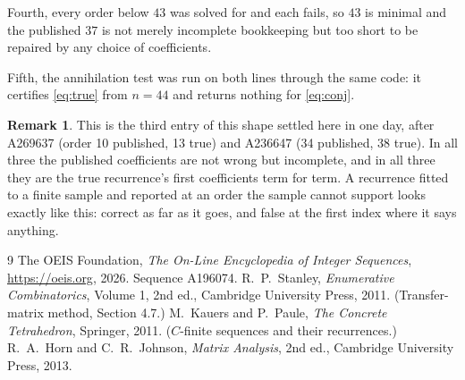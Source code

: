 \documentclass[11pt,a4paper]{article}
\theoremstyle{plain}
\theoremstyle{definition}
\newtheorem{remark}[theorem]{Remark}
\begin{document}
Fourth, every order below $43$ was solved for and each fails, so $43$ is minimal and the
published $37$ is not merely incomplete bookkeeping but too short to be repaired by any
choice of coefficients.

Fifth, the annihilation test was run on both lines through the same code: it certifies
\eqref{eq:true} from $n=44$ and returns nothing for \eqref{eq:conj}.

\begin{remark}
This is the third entry of this shape settled here in one day, after A269637 (order 10
published, 13 true) and A236647 (34 published, 38 true). In all three the published
coefficients are not wrong but incomplete, and in all three they are the true recurrence's
first coefficients term for term. A recurrence fitted to a finite sample and reported at an
order the sample cannot support looks exactly like this: correct as far as it goes, and false
at the first index where it says anything.
\end{remark}

\begin{thebibliography}{9}
 The OEIS Foundation, \emph{The On-Line Encyclopedia of Integer Sequences},
\url{https://oeis.org}, 2026. Sequence A196074.
 R.~P.~Stanley, \emph{Enumerative Combinatorics}, Volume 1, 2nd ed.,
Cambridge University Press, 2011. (Transfer-matrix method, Section 4.7.)
 M.~Kauers and P.~Paule, \emph{The Concrete Tetrahedron}, Springer, 2011.
($C$-finite sequences and their recurrences.)
 R.~A.~Horn and C.~R.~Johnson, \emph{Matrix Analysis}, 2nd ed., Cambridge
University Press, 2013.
\end{thebibliography}
\end{document}
